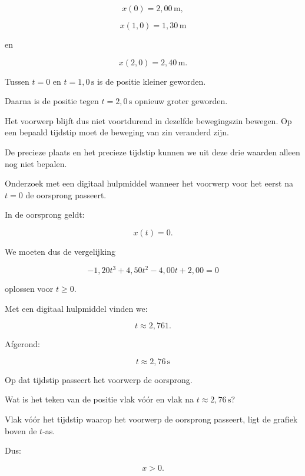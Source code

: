 \documentclass{ximera}
\begin{document}
\begin{oefening}{\oefU\ESS}
\begin{question}
\begin{oplossing}
  \[
  x(0)=2{,}00\,\mathrm{m},
  \]
  
  \[
  x(1{,}0)=1{,}30\,\mathrm{m}
  \]
  
  en
  
  \[
  x(2{,}0)=2{,}40\,\mathrm{m}.
  \]
  
  Tussen $t=0$ en $t=1{,}0\,\mathrm{s}$ is de positie kleiner geworden.
  
  Daarna is de positie tegen $t=2{,}0\,\mathrm{s}$ opnieuw groter geworden.
  
  Het voorwerp blijft dus niet voortdurend in dezelfde bewegingszin bewegen.
  Op een bepaald tijdstip moet de beweging van zin veranderd zijn.
  
  De precieze plaats en het precieze tijdstip kunnen we uit deze drie waarden
  alleen nog niet bepalen.
  \end{oplossing}
  \end{question}
  
  
  \begin{question}
  Onderzoek met een digitaal hulpmiddel wanneer het voorwerp voor het eerst
  na $t=0$ de oorsprong passeert.
  
  \begin{oplossing}
  In de oorsprong geldt:
  
  \[
  x(t)=0.
  \]
  
  We moeten dus de vergelijking
  
  \[
  -1{,}20t^3
  +4{,}50t^2
  -4{,}00t
  +2{,}00
  =
  0
  \]
  
  oplossen voor $t\geq0$.
  
  Met een digitaal hulpmiddel vinden we:
  
  \[
  t\approx2{,}761.
  \]
  
  Afgerond:
  
  \[
  \boxed{t\approx2{,}76\,\mathrm{s}}
  \]
  
  Op dat tijdstip passeert het voorwerp de oorsprong.
  \end{oplossing}
  \end{question}
  
  
  \begin{question}
  Wat is het teken van de positie vlak vóór en vlak na
  $t\approx2{,}76\,\mathrm{s}$?
  
  \begin{oplossing}
  Vlak vóór het tijdstip waarop het voorwerp de oorsprong passeert, ligt de
  grafiek boven de $t$-as.
  
  Dus:
  
  \[
  x>0.
  \]
  

\end{oplossing}
\end{question}
\end{oefening}
\end{document}
